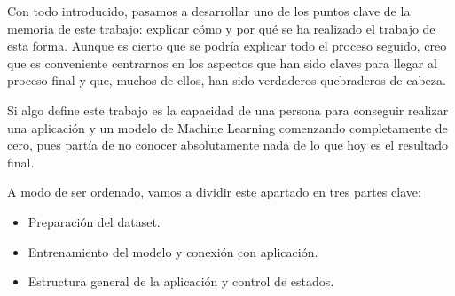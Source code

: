 

	Con todo introducido, pasamos a desarrollar uno de los puntos clave de la memoria de este trabajo: explicar cómo y por qué se ha realizado el trabajo de esta forma. Aunque es cierto que se podría explicar todo el proceso seguido, creo que es conveniente centrarnos en los aspectos que han sido claves para llegar al proceso final y que, muchos de ellos, han sido verdaderos quebraderos de cabeza.
	
	Si algo define este trabajo es la capacidad de una persona para conseguir realizar una aplicación y un modelo de Machine Learning comenzando completamente de cero, pues partía de no conocer absolutamente nada de lo que hoy es el resultado final. 
	
	A modo de ser ordenado, vamos a dividir este apartado en tres partes clave:
	\begin{itemize}
		\item Preparación del dataset.
		\item Entrenamiento del modelo y conexión con aplicación.
		\item Estructura general de la aplicación y control de estados.
	\end{itemize}
	
